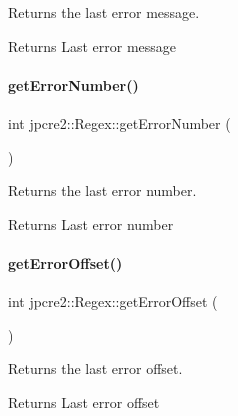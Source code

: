 Returns the last error message. 

\begin{DoxyReturn}{Returns}
Last error message 
\end{DoxyReturn}
\hypertarget{classjpcre2_1_1Regex_a7294273e7d11907a749f2db40da9ed15_a7294273e7d11907a749f2db40da9ed15}{}\label{classjpcre2_1_1Regex_a7294273e7d11907a749f2db40da9ed15_a7294273e7d11907a749f2db40da9ed15} 
\paragraph{\texorpdfstring{get\+Error\+Number()}{getErrorNumber()}}
{\footnotesize\ttfamily int jpcre2\+::\+Regex\+::get\+Error\+Number (\begin{DoxyParamCaption}{ }\end{DoxyParamCaption})\hspace{0.3cm}{\ttfamily [inline]}}



Returns the last error number. 

\begin{DoxyReturn}{Returns}
Last error number 
\end{DoxyReturn}
\hypertarget{classjpcre2_1_1Regex_ae8c6c8f728c58d9b171c68b4b166e195_ae8c6c8f728c58d9b171c68b4b166e195}{}\label{classjpcre2_1_1Regex_ae8c6c8f728c58d9b171c68b4b166e195_ae8c6c8f728c58d9b171c68b4b166e195} 
\paragraph{\texorpdfstring{get\+Error\+Offset()}{getErrorOffset()}}
{\footnotesize\ttfamily int jpcre2\+::\+Regex\+::get\+Error\+Offset (\begin{DoxyParamCaption}{ }\end{DoxyParamCaption})\hspace{0.3cm}{\ttfamily [inline]}}



Returns the last error offset. 

\begin{DoxyReturn}{Returns}
Last error offset 
\end{DoxyReturn}
\hypertarget{classjpcre2_1_1Regex_a5d2d04eb7c393338a4c8cce941e957ef_a5d2d04eb7c393338a4c8cce941e957ef}{}\label{classjpcre2_1_1Regex_a5d2d04eb7c393338a4c8cce941e957ef_a5d2d04eb7c393338a4c8cce941e957ef} 
